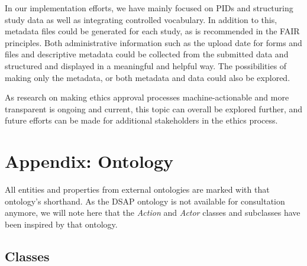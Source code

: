 \documentclass[10pt]{article}
\begin{document}
In our implementation efforts, we have mainly focused on PIDs and structuring study data as well as integrating controlled vocabulary. In addition to this, metadata files could be generated for each study, as is recommended in the FAIR principles. Both administrative information such as the upload date for forms and files and descriptive metadata could be collected from the submitted data and structured and displayed in a meaningful and helpful way. The possibilities of making only the metadata, or both metadata and data could also be explored.

As research on making ethics approval processes machine-actionable and more transparent is ongoing and current, this topic can overall be explored further, and future efforts can be made for additional stakeholders in the ethics process. 

\newpage
\clearpage
{}


\newpage
{}
\listoffigures
\newpage
\appendix
\section{Appendix: Ontology}
All entities and properties from external ontologies are marked with that ontology's shorthand. As the DSAP ontology is not available for consultation anymore, we will note here that the \textit{Action} and \textit{Actor} classes and subclasses have been inspired by that ontology.
\subsection*{Classes}
 
\end{document}
